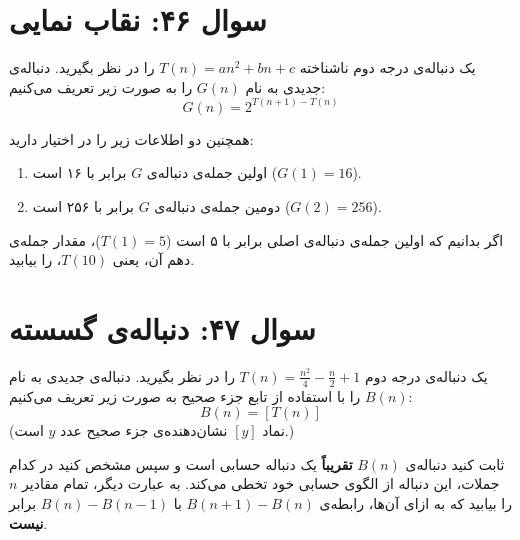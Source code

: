 \documentclass[12pt]{article}
\begin{document}
	\section*{سوال ۴۶: نقاب نمایی }
	یک دنباله‌ی درجه دوم ناشناخته \( T(n) = an^2 + bn + c \) را در نظر بگیرید. دنباله‌ی جدیدی به نام \(G(n)\) را به صورت زیر تعریف می‌کنیم:
	\begin{displaymath}
		G(n) = 2^{T(n+1) - T(n)}
	\end{displaymath}
	\vspace{0.5cm}
	
	 همچنین دو اطلاعات زیر را در اختیار دارید:
	\begin{enumerate}[label=(\roman*)]
		\item اولین جمله‌ی دنباله‌ی \(G\) برابر با ۱۶ است (\(G(1) = 16\)).
		\item دومین جمله‌ی دنباله‌ی \(G\) برابر با ۲۵۶ است (\(G(2) = 256\)).
	\end{enumerate}
	\vspace{0.5cm}
	
	اگر بدانیم که اولین جمله‌ی دنباله‌ی اصلی برابر با ۵ است (\(T(1) = 5\))، مقدار جمله‌ی دهم آن، یعنی \(T(10)\)، را بیابید.
	
	\vspace{1cm}
	\hrulefill
	\vspace{1cm}
	
	\section*{سوال ۴۷: دنباله‌ی گسسته }
	یک دنباله‌ی درجه دوم \( T(n) = \frac{n^2}{4} - \frac{n}{2} + 1 \) را در نظر بگیرید. دنباله‌ی جدیدی به نام \(B(n)\) را با استفاده از تابع جزء صحیح به صورت زیر تعریف می‌کنیم:
	\begin{displaymath}
		B(n) = [T(n)]
	\end{displaymath}
	(نماد \( [y] \) نشان‌دهنده‌ی جزء صحیح عدد \(y\) است.)
	\vspace{0.5cm}
	
	ثابت کنید دنباله‌ی \(B(n)\) \textbf{تقریباً} یک دنباله حسابی است و سپس مشخص کنید در کدام جملات، این دنباله از الگوی حسابی خود تخطی می‌کند. به عبارت دیگر، تمام مقادیر \(n\) را بیابید که به ازای آن‌ها، رابطه‌ی \( B(n+1) - B(n) \) با \( B(n) - B(n-1) \) برابر \textbf{نیست}.
	
	\vspace{1cm}
	\hrulefill
	\vspace{1cm}
	
\end{document}
